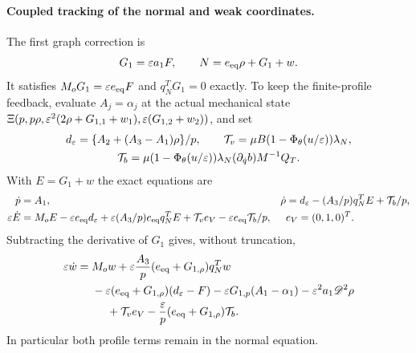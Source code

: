 \paragraph{Coupled tracking of the normal and weak coordinates.}
The first graph correction is
\begin{equation}
 G_1=\varepsilon a_1F,\qquad N=e_{\rm eq}\rho+G_1+w.
 \label{ent:first-graph}
\end{equation}
It satisfies $M_oG_1=\varepsilon e_{\rm eq}F$ and $q_N^TG_1=0$ exactly.
To keep the finite-profile feedback, evaluate $A_j=\alpha_j$
at the actual mechanical state
$\Xi(p,p\rho,\varepsilon^2(2\rho+G_{1,1}+w_1),\varepsilon(G_{1,2}+w_2))$,
and set
\[
 \begin{gathered}
 d_\varepsilon=\{A_2+(A_3-A_1)\rho\}/p,\qquad
 \mathcal T_v=\mu B(1-\Phi_\theta(u/\varepsilon))\lambda_N,\\
 \mathcal T_b=\mu(1-\Phi_\theta(u/\varepsilon))\lambda_N
                      (\partial_{\dot q}b)M^{-1}Q_T.
 \end{gathered}
\]
With $E=G_1+w$ the exact equations are
\begin{align*}
 \dot p&=A_1,&
 \dot\rho&=d_\varepsilon-(A_3/p)q_N^TE+\mathcal T_b/p,\\
 \varepsilon\dot E&=M_oE-\varepsilon e_{\rm eq}d_\varepsilon+
       \varepsilon(A_3/p)e_{\rm eq}q_N^TE+\mathcal T_ve_V-\varepsilon e_{\rm eq}\mathcal T_b/p,
 &&e_V=(0,1,0)^T.
\end{align*}
Subtracting the derivative of $G_1$ gives, without truncation,
\begin{equation}
 \begin{split}
 \eps\dot w={}&M_ow+\eps\frac{A_3}{p}(e_{\rm eq}+G_{1,\rho})q_N^Tw\\
 &-\eps(e_{\rm eq}+G_{1,\rho})(d_\eps-F)-\eps G_{1,p}(A_1-\alpha_1)
 -\eps^2a_1\mathscr D^2\rho\\
 &\phantom{{}={}}
 +\mathcal T_ve_V-\frac\eps p(e_{\rm eq}+G_{1,\rho})\mathcal T_b.
 \end{split}
 \label{ent:exact-remainder}
\end{equation}
In particular both profile terms remain in the normal equation.

